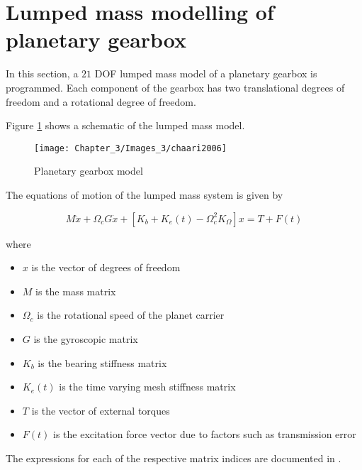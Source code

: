 \section{Lumped mass modelling of planetary gearbox}

In this section, a $21$ DOF lumped mass model of a planetary gearbox \citep{Chaari2006} is programmed. Each component of the gearbox has two translational degrees of freedom and a rotational degree of freedom.

Figure \ref{F:model} shows a schematic of the lumped mass model. 

\begin{figure}[H]
	\centering
	\texttt{[image: Chapter\_3/Images\_3/chaari2006]}
	\caption{Planetary gearbox model \citep{Chaari2006}}
	\label{F:model}
\end{figure}

The equations of motion of the lumped mass system is given by 

\begin{equation}
M \ddot{x}+\Omega_{c} G \dot{x}+\left[K_{b}+K_{e}(t)-\Omega_{c}^{2} K_{\Omega}\right] x=T+F(t)
\end{equation}

where 
\begin{itemize}
	\item $x$ is the vector of degrees of freedom
	\item $M$ is the mass matrix
	\item $\Omega_{c}$ is the rotational speed of the planet carrier
	\item $G$ is the gyroscopic matrix 
	\item $K_{b}$ is the bearing stiffness matrix
	\item $K_{e}(t)$ is the time varying mesh stiffness matrix
	\item $T$ is the vector of external torques
	\item $F(t)$ is the excitation force vector due to factors such as transmission error        
\end{itemize}

The expressions for each of the respective matrix indices are documented in \cite{Chaari2006}.



